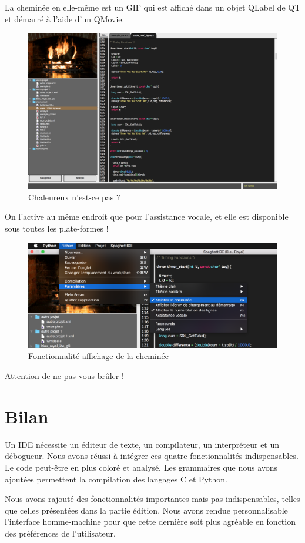 \documentclass[a4paper,12pt]{article}
\begin{document}
		La cheminée en elle-même est un GIF qui est affiché dans un objet QLabel de QT et démarré à l'aide d'un QMovie.\\
		
		\begin{figure}[h!]
			\begin{center}
					\includegraphics[scale=0.3]{images/cheminee}
					\caption{Chaleureux n'est-ce pas ?}
			\end{center}
	\end{figure}
	
	On l'active au même endroit que pour l'assistance vocale, et elle est disponible sous toutes les plate-formes !\\
	
	\begin{figure}[h!]
			\begin{center}
					\includegraphics[scale=0.2]{images/activ_cheminee}
					\caption{Fonctionnalité affichage de la cheminée}
			\end{center}
	\end{figure}
	
	Attention de ne pas vous brûler !

\section{Bilan}

Un IDE nécessite un éditeur de texte, un compilateur, un interpréteur et un débogueur. Nous avons réussi à intégrer ces quatre fonctionnalités indispensables. Le code peut-être en plus coloré et analysé. Les grammaires que nous avons ajoutées permettent la compilation des langages C et Python.

Nous avons rajouté des fonctionnalités importantes mais pas indispensables, telles que celles présentées dans la partie édition. Nous avons rendue personnalisable l'interface homme-machine pour que cette dernière soit plus agréable en fonction des préférences de l'utilisateur.
\end{document}
